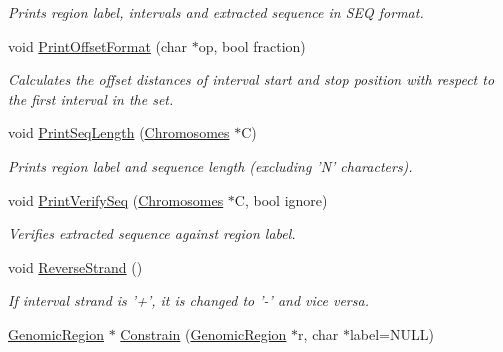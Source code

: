 \begin{CompactItemize}
\begin{CompactList}\small\item\em Prints region label, intervals and extracted sequence in SEQ format. \item\end{CompactList}\item 
void \hyperlink{classGenomicRegion_33d1e5544b3fb81e8c19468b91920b1d}{PrintOffsetFormat} (char $\ast$op, bool fraction)
\begin{CompactList}\small\item\em Calculates the offset distances of interval start and stop position with respect to the first interval in the set. \item\end{CompactList}\item 
\hypertarget{classGenomicRegion_7a8ac4f469447256253bdbdcb1b4a956}{
void \hyperlink{classGenomicRegion_7a8ac4f469447256253bdbdcb1b4a956}{PrintSeqLength} (\hyperlink{classChromosomes}{Chromosomes} $\ast$C)}
\label{classGenomicRegion_7a8ac4f469447256253bdbdcb1b4a956}

\begin{CompactList}\small\item\em Prints region label and sequence length (excluding 'N' characters). \item\end{CompactList}\item 
\hypertarget{classGenomicRegion_77fa696d55d538b365d15a7a30391132}{
void \hyperlink{classGenomicRegion_77fa696d55d538b365d15a7a30391132}{PrintVerifySeq} (\hyperlink{classChromosomes}{Chromosomes} $\ast$C, bool ignore)}
\label{classGenomicRegion_77fa696d55d538b365d15a7a30391132}

\begin{CompactList}\small\item\em Verifies extracted sequence against region label. \item\end{CompactList}\item 
\hypertarget{classGenomicRegion_9304039f70c5110b961cc9de77974d09}{
void \hyperlink{classGenomicRegion_9304039f70c5110b961cc9de77974d09}{ReverseStrand} ()}
\label{classGenomicRegion_9304039f70c5110b961cc9de77974d09}

\begin{CompactList}\small\item\em If interval strand is '+', it is changed to '-' and vice versa. \item\end{CompactList}\item 
\hypertarget{classGenomicRegion_50f5ba99404da1cdae6a8632a19ff837}{
\hyperlink{classGenomicRegion}{GenomicRegion} $\ast$ \hyperlink{classGenomicRegion_50f5ba99404da1cdae6a8632a19ff837}{Constrain} (\hyperlink{classGenomicRegion}{GenomicRegion} $\ast$r, char $\ast$label=NULL)}
\label{classGenomicRegion_50f5ba99404da1cdae6a8632a19ff837}


\end{CompactItemize}
